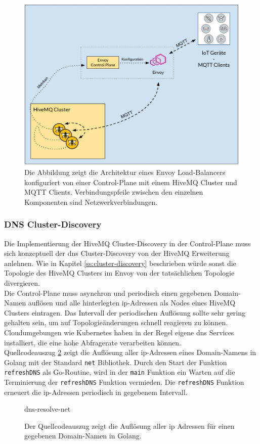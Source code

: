 \begin{figure}[h]
    \centering
    \includegraphics[scale=0.36]{images/control-plane-architecture.png}
    \caption{Die Abbildung zeigt die Architektur eines Envoy Load-Balancers konfiguriert von einer Control-Plane mit einem HiveMQ Cluster und MQTT Clients. Verbindungspfeile zwischen den einzelnen Komponenten sind Netzwerkverbindungen.}
    \label{fig:control-plane-architecture}
\end{figure}

\subsubsection{DNS Cluster-Discovery} \label{ss:dns-discovery}
Die Implementierung der HiveMQ Cluster-Discovery in der Control-Plane muss sich konzeptuell der \ac{dns} Cluster-Discovery von der HiveMQ Erweiterung anlehnen. Wie in Kapitel \ref{ss:cluster-discovery} beschrieben würde sonst die Topologie des HiveMQ Clusters im Envoy von der tatsächlichen Topologie divergieren.
\\
Die Control-Plane muss asynchron und periodisch einen gegebenen Domain-Namen auflösen und alle hinterlegten \ac{ip}-Adressen als Nodes eines HiveMQ Clusters eintragen. Das Intervall der periodischen Auflösung sollte sehr gering gehalten sein, um auf Topologieänderungen schnell reagieren zu können.
Cloudumgebungen wie Kubernetes haben in der Regel eigene \ac{dns} Services installiert, die eine hohe Abfragerate verarbeiten können.
\\
Quellcodeauszug \ref{code:dns-resolve-net} zeigt die Auflösung aller \ac{ip}-Adressen eines Domain-Namens in Golang mit der Standard \verb|net| Bibliothek.
Durch den Start der Funktion \verb|refreshDNS| als Go-Routine, wird in der \verb|main| Funktion ein Warten auf die Terminierung der \verb|refreshDNS| Funktion vermieden.
Die \verb|refreshDNS| Funktion erneuert die \ac{ip}-Adressen periodisch in gegebenem Intervall.
\begin{figure}
    {dns-resolve-net}
    \caption{Der Quellcodeauszug zeigt die Auflösung aller \ac{ip} Adressen für einen gegebenen Domain-Namen in Golang.}
    \label{code:dns-resolve-net}
\end{figure}

